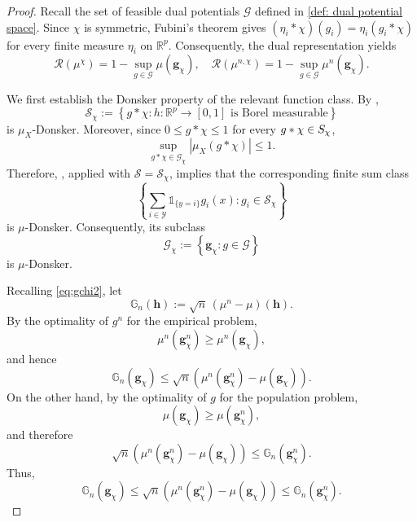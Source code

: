 \documentclass{amsart}
\theoremstyle{plain}
\numberwithin{equation}{section}\newtheorem{theorem}{Theorem}[section]
\theoremstyle{remark}
\begin{document}
\begin{proof}
Recall the set of feasible dual potentials $\mathcal{G}$ defined in \eqref{def: dual potential space}. Since $\chi$ is symmetric, Fubini's theorem gives $(\eta_i*\chi)(g_i)
    =
    \eta_i(g_i*\chi)$
for every finite measure $\eta_i$ on $\mathbb R^p$. Consequently, the
dual representation yields
\begin{equation}\label{eq: smoothed dual representation}
    \mathscr R(\mu^\chi)
    =
    1-\sup_{g \in \mathcal{G}}\mu(\bm g_\chi),
    \quad
    \mathscr R(\mu^{n,\chi})
    =
    1-\sup_{g \in \mathcal{G}}\mu^n(\bm g_\chi).
\end{equation}




We first establish the Donsker property of the relevant function class. By ,
\[
    \mathcal{S}_\chi:=\left\{
        g*\chi:
        h:\mathbb R^p\to[0,1]
        \text{ is Borel measurable}
    \right\}
\]
is $\mu_X$-Donsker. Moreover, since $0\leq g*\chi\leq1$ for every
$g*\chi\in\mathcal \mathcal{S}_\chi$,
\[
    \sup_{g*\chi \in\mathcal G_\chi}|\mu_X(g*\chi)|\leq1.
\]
Therefore, , applied with
$\mathcal{S}=\mathcal{S}_\chi$, implies that the corresponding finite sum class
\[
    \left\{
        \sum_{i\in\mathcal Y}
        \mathds 1_{\{y=i\}}g_i(x):
        g_i\in \mathcal{S}_\chi
    \right\}
\]
is $\mu$-Donsker. Consequently, its subclass
\[
    \mathcal G_\chi
    :=
    \left\{
        \bm g_\chi:g \in \mathcal{G}
    \right\}
\]
is $\mu$-Donsker.




Recalling \eqref{eq:gchi2}, let
\[
    \mathbb G_n(\bm{h})
    :=
    \sqrt n\,(\mu^n-\mu)(\bm{h}).
\]
By the optimality of $g^n$ for the empirical problem,
\[
    \mu^n(\bm g_\chi^n)
    \geq
    \mu^n(\bm g_\chi),
\]
and hence
\[
    \mathbb G_n(\bm g_\chi)
    \leq
    \sqrt n(\mu^n(\bm g_\chi^n)-\mu(\bm g_\chi)).
\]
On the other hand, by the optimality of $g$ for the population problem,
\[
    \mu(\bm g_\chi)
    \geq
    \mu(\bm g_\chi^n),
\]
and therefore
\[
    \sqrt n(\mu^n(\bm g_\chi^n)- \mu(\bm g_\chi))
    \leq
    \mathbb G_n(\bm g_\chi^n).
\]
Thus,
\begin{equation}\label{eq: smoothed CLT sandwich}
    \mathbb G_n(\bm g_\chi)
    \leq
    \sqrt n(\mu^n(\bm g_\chi^n)- \mu(\bm g_\chi))
    \leq
    \mathbb G_n(\bm g_\chi^n).
\end{equation}


\end{proof}
\end{document}
